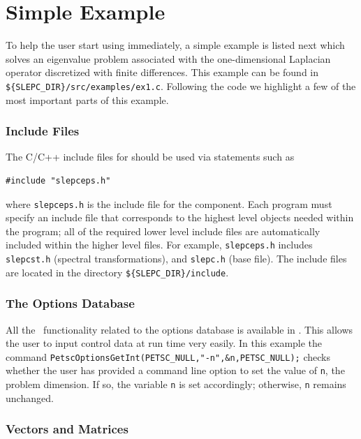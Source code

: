 \section{Simple \slepc Example}
\label{sec:simpleex}

To help the user start using \slepc immediately, a simple example is listed next which solves an eigenvalue problem associated with the
one-dimensional Laplacian operator discretized with finite differences.  This
example can be found in \Verb!${SLEPC_DIR}/src/examples/ex1.c!.
Following the code we highlight a few of the most important parts of this example.  


\subsubsection*{Include Files}

The C/C++ include files for \slepc should be used via statements such as
	\begin{Verbatim}[fontsize=\small]
	#include "slepceps.h"
	\end{Verbatim}
where \Verb!slepceps.h! is the include file for the  component.
Each \slepc program must specify an
include file that corresponds to the highest level \slepc objects
needed within the program; all of the required lower level include
files are automatically included within the higher level files. 
For
example, \Verb!slepceps.h! includes \Verb!slepcst.h! (spectral transformations),
and \Verb!slepc.h! (base \slepc file).  
The \slepc include files are located in the directory 
\Verb!${SLEPC_DIR}/include!.

\subsubsection*{The Options Database}

All the \petsc\ functionality related to the options database is available in \slepc. This allows the user to input control data
at run time very easily. In this example the command
\Verb!PetscOptionsGetInt(PETSC_NULL,"-n",&n,PETSC_NULL);! checks whether the user has
provided a command line option to set the value of \Verb!n!, the
problem dimension.  If so, the variable \Verb!n! is set accordingly;
otherwise, \Verb!n! remains unchanged.

\subsubsection*{Vectors and Matrices}

